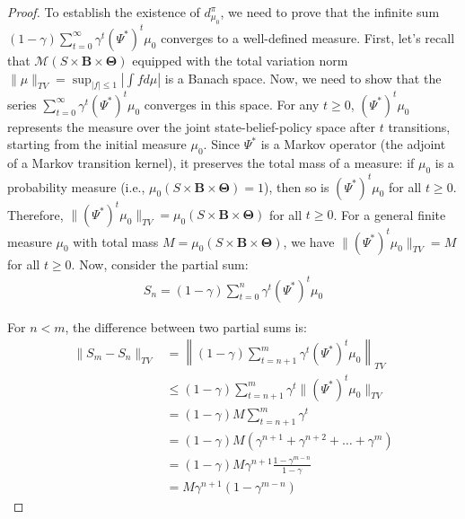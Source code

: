 \begin{proof}
    To establish the existence of $d^{\pi}_{\mu_0}$, we need to prove that the
    infinite sum $(1-\gamma) \sum_{t=0}^{\infty}\gamma^{t} (\Psi^{*})^{t} \mu_{0}$
    converges to a well-defined measure. First, let's recall that
    $\mathcal{M}(S \times \boldsymbol{B}\times \boldsymbol{\Theta})$ equipped with
    the total variation norm
    $\|\mu\|_{TV}= \sup_{|f| \leq 1}\left|\int f d\mu\right|$ is a Banach space. Now,
    we need to show that the series
    $\sum_{t=0}^{\infty}\gamma^{t} (\Psi^{*})^{t} \mu_{0}$ converges in this space.
    For any $t \geq 0$, $(\Psi^{*})^{t} \mu_{0}$ represents the measure over the
    joint state-belief-policy space after $t$ transitions, starting from the initial
    measure $\mu_{0}$. Since $\Psi^{*}$ is a Markov operator (the adjoint of a Markov
    transition kernel), it preserves the total mass of a measure: if $\mu_{0}$ is
    a probability measure (i.e., $\mu_{0}(S \times \boldsymbol{B}\times \boldsymbol
        {\Theta}) = 1$), then so is $(\Psi^{*})^{t} \mu_{0}$ for all $t \geq 0$.
    Therefore, $\|(\Psi^{*})^{t} \mu_{0}\|_{TV}= \mu_{0}(S \times \boldsymbol{B}\times
        \boldsymbol{\Theta})$ for all $t \geq 0$. For a general finite measure
    $\mu_{0}$ with total mass
    $M = \mu_{0}(S \times \boldsymbol{B}\times \boldsymbol{\Theta})$, we have $\|(\Psi
        ^{*})^{t} \mu_{0}\|_{TV}= M$ for all $t \geq 0$. Now, consider the partial sum:
    \begin{align}
        S_{n} = (1-\gamma) \sum_{t=0}^{n}\gamma^{t} (\Psi^{*})^{t} \mu_{0}
    \end{align}

    For $n < m$, the difference between two partial sums is:
    \begin{align}
        \|S_{m} - S_{n}\|_{TV} & = \left\| (1-\gamma) \sum_{t=n+1}^{m}\gamma^{t} (\Psi^{*})^{t} \mu_{0} \right\|_{TV} \\
                               & \leq (1-\gamma) \sum_{t=n+1}^{m}\gamma^{t} \|(\Psi^{*})^{t} \mu_{0}\|_{TV}           \\
                               & = (1-\gamma) M \sum_{t=n+1}^{m}\gamma^{t}                                            \\
                               & = (1-\gamma) M (\gamma^{n+1}+ \gamma^{n+2}+ \ldots + \gamma^{m})                     \\
                               & = (1-\gamma) M \gamma^{n+1}\frac{1 - \gamma^{m-n}}{1 - \gamma}                       \\
                               & = M \gamma^{n+1}(1 - \gamma^{m-n})
    \end{align}


\end{proof}
